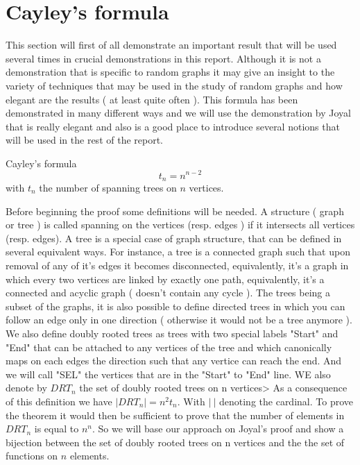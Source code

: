 \section{Cayley's formula}
This section will first of all demonstrate an important result that will be used several times in crucial demonstrations in this report. Although it is not a demonstration that is specific to random graphs it may give an insight to the variety of techniques that may be used in the study of random graphs and how elegant are the results ( at least quite often ). This formula has been demonstrated in many different ways and we will use the demonstration by Joyal that is really elegant and also is a good place to introduce several notions that will be used in the rest of the report. 
\begin{theorem}{Cayley's formula}
\begin{equation}
    t_n = n^{n-2}
\end{equation}
with $t_n$ the number of spanning trees on $n$ vertices.
\end{theorem}
Before beginning the proof some definitions will be needed. A structure ( graph or tree ) is called spanning on the vertices (resp. edges ) if it intersects all vertices (resp. edges). A tree is a special case of graph structure, that can be defined in several equivalent ways. For instance, a tree is a connected graph such that upon removal of any of it's edges it becomes disconnected, equivalently, it's a graph in which every two vertices are linked by exactly one path, equivalently, it's a connected and acyclic graph ( doesn't contain any cycle ).
\newline 
The trees being a subset of the graphs, it is also possible to define directed trees in which you can follow an edge only in one direction ( otherwise it would not be a tree anymore ).
We also define doubly rooted trees as trees with two special labels "Start" and "End" that can be attached to any vertices of the tree and which canonically maps on each edges the direction such that any vertice can reach the end. And we will call "SEL" the vertices that are in the "Start" to "End" line. WE also denote by $DRT_n$ the set of doubly rooted trees on n vertices>
\newline
As a consequence of this definition we have $|DRT_n| = n^2 t_n$. With $|\ |$ denoting the cardinal. To prove the theorem it would then be sufficient to prove that the number of elements in $DRT_n$ is equal to $n^n$. So we will base our approach on Joyal's proof and show a bijection between the set of doubly rooted trees on n vertices and the the set of functions on $n$ elements.
